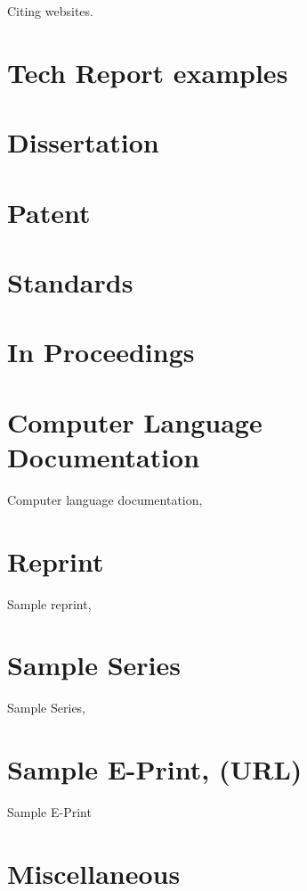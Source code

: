 \documentclass[NumberedRefs]{JASA-EL}
\begin{document}
Citing websites\cite{website}.


\section*{Tech Report examples}
\cite{samptechreport3,samptechreport4}


\section*{Dissertation}
\cite{sampthesis}

\section*{Patent}

\cite{samppatent}

\section*{Standards}

\cite{sampstandards,sampstandards2}


\section*{In Proceedings}

 \cite{sampinproceedings2,
sampinproceedings3}

\section*{Computer Language Documentation}
Computer language documentation, 
\cite{sampcode,sampcode2}

\section*{Reprint}
Sample reprint, 
\cite{sampReprint}

\section*{Sample Series}
Sample Series, 
\cite{sampSeries}

\section*{Sample E-Print, (URL)}
 Sample E-Print 
\cite{sampEprint2}

\section*{Miscellaneous}
\cite{sampMisc}


\end{document}
